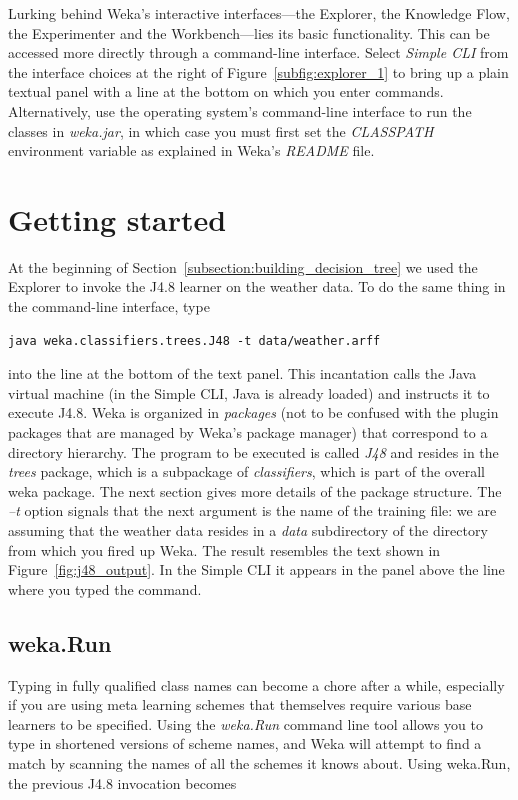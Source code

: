 Lurking behind Weka’s interactive interfaces---the Explorer, the
Knowledge Flow, the Experimenter and the Workbench---lies its basic
functionality. This can be accessed more directly through a
command-line interface. Select \textit{Simple CLI} from the interface
choices at the right of Figure~\ref{subfig:explorer_1} to bring up a
plain textual panel with a line at the bottom on which you enter
commands. Alternatively, use the operating system’s command-line
interface to run the classes in \textit{weka.jar}, in which case you
must first set the \textit{CLASSPATH} environment variable as
explained in Weka’s \textit{README} file.

\section{Getting started}

At the beginning of Section~\ref{subsection:building_decision_tree} we
used the Explorer to invoke the J4.8 learner on the weather data. To
do the same thing in the command-line interface, type

\begin{Verbatim}[fontsize=\footnotesize]
java weka.classifiers.trees.J48 -t data/weather.arff
\end{Verbatim}

\noindent into the line at the bottom of the text panel. This
incantation calls the Java virtual machine (in the Simple CLI, Java is
already loaded) and instructs it to execute J4.8. Weka is organized in
\textit{packages} (not to be confused with the plugin packages that
are managed by Weka's package manager) that correspond to a directory
hierarchy. The program to be executed is called \textit{J48} and
resides in the \textit{trees} package, which is a subpackage of
\textit{classifiers}, which is part of the overall weka package. The
next section gives more details of the package structure. The
\textit{--t} option signals that the next argument is the name of the
training file: we are assuming that the weather data resides in a
\textit{data} subdirectory of the directory from which you fired up
Weka. The result resembles the text shown in
Figure~\ref{fig:j48_output}. In the Simple CLI it appears in the panel
above the line where you typed the command.

\subsection{weka.Run}

Typing in fully qualified class names can become a chore after a
while, especially if you are using meta learning schemes that
themselves require various base learners to be specified. Using the
\textit{weka.Run} command line tool allows you to type in shortened versions of
scheme names, and Weka will attempt to find a match by scanning the
names of all the schemes it knows about. Using weka.Run, the previous
J4.8 invocation becomes

